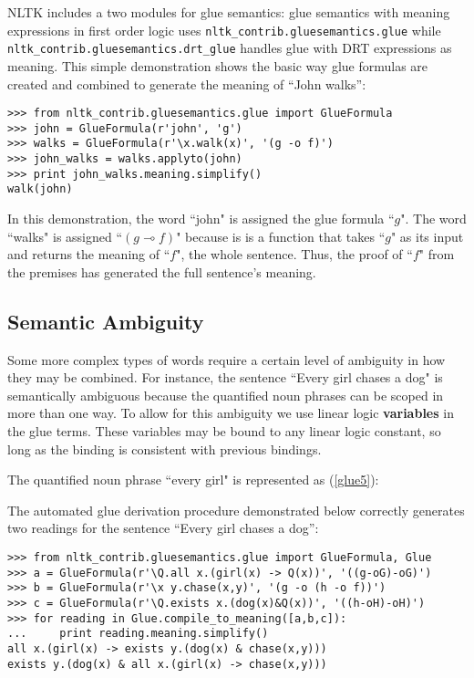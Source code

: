 \documentclass{article}
\newcommand{\dhgcode}[1]{{\tt #1}}
\begin{document}

NLTK includes a two modules for glue semantics: glue semantics with meaning expressions in first order logic uses \dhgcode{nltk\_contrib.gluesemantics.glue} while \dhgcode{nltk\_contrib.gluesemantics.drt\_glue} handles glue with DRT expressions as meaning.  This simple demonstration shows the basic way glue formulas are created and combined to generate the meaning of ``John walks'':

\begin{verbatim}
>>> from nltk_contrib.gluesemantics.glue import GlueFormula
>>> john = GlueFormula(r'john', 'g')
>>> walks = GlueFormula(r'\x.walk(x)', '(g -o f)')
>>> john_walks = walks.applyto(john)
>>> print john_walks.meaning.simplify()
walk(john)
\end{verbatim}

In this demonstration, the word ``john" is assigned the glue formula ``$g$".  The word ``walks" is assigned ``$(g \multimap f)$" because is is a function that takes ``$g$" as its input and returns the meaning of ``$f$", the whole sentence.  Thus, the proof of ``$f$" from the premises has generated the full sentence's meaning.

\subsection{Semantic Ambiguity}

Some more complex types of words require a certain level of ambiguity in how they may be combined.  For instance, the sentence ``Every girl chases a dog" is semantically ambiguous because the quantified noun phrases can be scoped in more than one way.  To allow for this ambiguity we use linear logic \textbf{variables} in the glue terms.  These variables may be bound to any linear logic constant, so long as the binding is consistent with previous bindings.

The quantified noun phrase ``every girl" is represented as (\ref{glue5}):



The automated glue derivation procedure demonstrated below correctly generates two readings for the sentence ``Every girl chases a dog'':

\begin{verbatim}
>>> from nltk_contrib.gluesemantics.glue import GlueFormula, Glue
>>> a = GlueFormula(r'\Q.all x.(girl(x) -> Q(x))', '((g-oG)-oG)')
>>> b = GlueFormula(r'\x y.chase(x,y)', '(g -o (h -o f))')
>>> c = GlueFormula(r'\Q.exists x.(dog(x)&Q(x))', '((h-oH)-oH)')
>>> for reading in Glue.compile_to_meaning([a,b,c]):
...     print reading.meaning.simplify()
all x.(girl(x) -> exists y.(dog(x) & chase(x,y)))
exists y.(dog(x) & all x.(girl(x) -> chase(x,y)))
\end{verbatim}

{}
\end{document}
